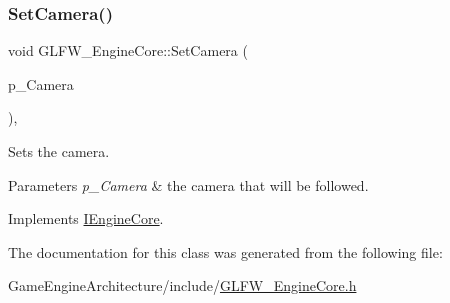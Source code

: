 \subsubsection{\texorpdfstring{SetCamera()}{SetCamera()}}
{\footnotesize\ttfamily void G\+L\+F\+W\+\_\+\+Engine\+Core\+::\+Set\+Camera (\begin{DoxyParamCaption}\item[{const std\+::shared\+\_\+ptr$<$ \mbox{\hyperlink{class_camera_component}{Camera\+Component}} $>$}]{p\+\_\+\+Camera }\end{DoxyParamCaption})\hspace{0.3cm}{\ttfamily [override]}, {\ttfamily [virtual]}}



Sets the camera. 


\begin{DoxyParams}{Parameters}
{\em p\+\_\+\+Camera} & the camera that will be followed. \\
\hline
\end{DoxyParams}


Implements \mbox{\hyperlink{class_i_engine_core_ac9f6dbe2b0e1ece6f6cc44712b9b8751}{I\+Engine\+Core}}.



The documentation for this class was generated from the following file\+:\begin{DoxyCompactItemize}
\item 
Game\+Engine\+Architecture/include/\mbox{\hyperlink{_g_l_f_w___engine_core_8h}{G\+L\+F\+W\+\_\+\+Engine\+Core.\+h}}\end{DoxyCompactItemize}
